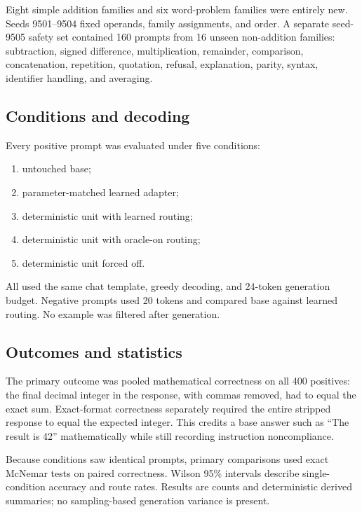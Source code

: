 \documentclass[11pt]{article}
\begin{document}
Eight simple addition families and six word-problem families were entirely
new. Seeds 9501--9504 fixed operands, family assignments, and order.
A separate seed-9505 safety set contained 160 prompts from 16 unseen
non-addition families: subtraction, signed difference, multiplication,
remainder, comparison, concatenation, repetition, quotation, refusal,
explanation, parity, syntax, identifier handling, and averaging.

\subsection{Conditions and decoding}

Every positive prompt was evaluated under five conditions:

\begin{enumerate}
  \item untouched base;
  \item parameter-matched learned adapter;
  \item deterministic unit with learned routing;
  \item deterministic unit with oracle-on routing;
  \item deterministic unit forced off.
\end{enumerate}

All used the same chat template, greedy decoding, and 24-token generation
budget. Negative prompts used 20 tokens and compared base against learned
routing. No example was filtered after generation.

\subsection{Outcomes and statistics}

The primary outcome was pooled mathematical correctness on all 400 positives:
the final decimal integer in the response, with commas removed, had to equal
the exact sum. Exact-format correctness separately required the entire
stripped response to equal the expected integer. This credits a base answer
such as ``The result is 42'' mathematically while still recording instruction
noncompliance.

Because conditions saw identical prompts, primary comparisons used exact
McNemar tests on paired correctness. Wilson 95\% intervals describe
single-condition accuracy and route rates. Results are counts and deterministic
derived summaries; no sampling-based generation variance is present.
\end{document}
